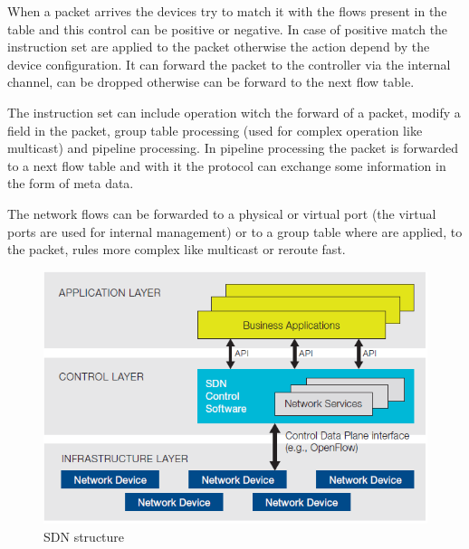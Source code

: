 When a packet arrives the devices try to match it with the flows present in the table and this control can be positive or negative. In case of positive match the instruction set are applied to the packet otherwise the action depend by the device configuration. It can forward the packet to the controller via the internal channel, can be dropped otherwise can be forward to the next flow table.

The instruction set can include operation witch the forward of a packet, modify a field in the packet, group table processing (used for complex operation like multicast) and pipeline processing. In pipeline processing the packet is forwarded to a next flow table and with it the protocol can exchange some information in the form of meta data.

The network flows can be forwarded to a physical or virtual port (the virtual ports are used for internal management) or to a group table where are applied, to the packet, rules more complex like multicast or reroute fast.

\begin{figure}
\centering
\includegraphics[scale=0.4]{Introduction/Image/SDNStructure.png}
\caption{\ac{SDN} structure}
\label{fig:sdn-and-openflow-overview:sdn-structure}
\end{figure}